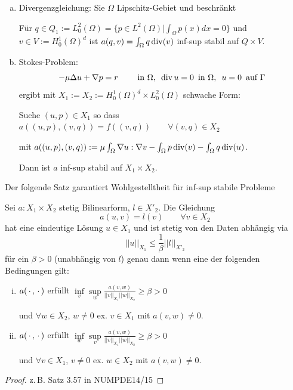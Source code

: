 \begin{bem}[Beispiel] \beginwithlistbem
\begin{enumerate}[a)]
\item Divergenzgleichung:  Sie $\Omega$ Lipschitz-Gebiet und beschränkt

Für $q \in Q_1 := L_0^2(\Omega) = \{p \in L^2 (\Omega) | \int_{\Omega} p(x) dx = 0 \}$ und $v \in V := H_0^1(\Omega)^d$ ist $a(q,v) = \int_{\Omega} q \operatorname{div}(v)$ inf-sup stabil auf $Q \times V$.
\item Stokes-Problem:
\[
	-\mu \Delta u + \nabla p = r \qquad \text{ in } \Omega, \,\,\, \operatorname{div} u=0 \, \text{ in } \Omega, \,\,\, u= 0 \, \text{ auf } \Gamma
\]
ergibt mit $X_1 := X_2 := H_0^1(\Omega)^d \times L_0^2(\Omega)$ schwache Form:

Suche $(u,p) \in X_1$ so dass $a((u,p),(v,q)) = f((v,q)) \qquad \forall (v,q) \in X_2$ 

mit $a((u,p),(v,q)) := \mu \int_{\Omega} \nabla u : \nabla v - \int_{\Omega} p \operatorname{div}(v) - \int_{\Omega} q \operatorname{div}(u)$.

Dann ist $a$ inf-sup stabil auf $X_1 \times X_2$.
\end{enumerate}
Der folgende Satz garantiert Wohlgestelltheit für inf-sup stabile Probleme
\end{bem}

\begin{satz}[Ne\v{c}as-Theorem] \label{4.11}
Sei $a: X_1 \times X_2$ stetig Bilinearform, $l \in X'_2$. Die Gleichung
\[
	a(u,v) = l(v) \qquad \forall v \in X_2
\]
hat eine eindeutige Lösung $u \in X_1$ und ist stetig von den Daten abhängig via
\[
	||u||_{X_1} \leq \frac{1}{\beta} ||l||_{X'_2}
\]
für ein $\beta > 0$ (unabhängig von $l$) genau dann wenn eine der folgenden Bedingungen gilt:
\begin{enumerate}[i)]
	\item $a(\,\cdot\,,\,\cdot\,)$ erfüllt $\inf\limits_v \sup\limits_w \frac{a(v,w)}{||v||_{X_1} ||w||_{X_2}} \geq \beta > 0$
	
	und $\forall w \in X_2$, $w \neq 0$ ex. $v \in X_1$ mit $a(v,w) \neq 0$.
	\item $a(\,\cdot\,,\,\cdot\,)$ erfüllt $\inf\limits_w \sup\limits_v \frac{a(v,w)}{||v||_{X_1} ||w||_{X_2}} \geq \beta > 0$
	
	und $\forall v \in X_1$, $v \neq 0$ ex. $w \in X_2$ mit $a(v,w) \neq 0$.
\end{enumerate}
\begin{proof}
	z.\,B. Satz 3.57 in NUMPDE14/15
\end{proof}
\end{satz}

